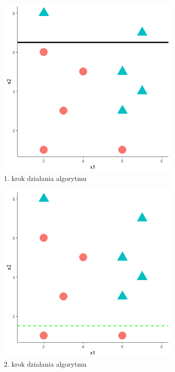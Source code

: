 \documentclass[12pt,a4paper,twoside,openany]{book}
\begin{document}
\begin{figure}[ht] 
  \begin{subfigure}[b]{0.5\linewidth}
    \centering
    \includegraphics[width=0.75\linewidth]{./rys005a} 
    \caption{1. krok działania algorytmu} 
    \label{rys005a} 
    \vspace{4ex}
  \end{subfigure}%
  \begin{subfigure}[b]{0.5\linewidth}
    \centering
    \includegraphics[width=0.75\linewidth]{./rys005b} 
    \caption{2. krok działania algorytmu} 
    \label{rys005b} 
    \vspace{4ex}
  \end{subfigure} 
  \begin{subfigure}[b]{0.5\linewidth}

\end{subfigure}
\end{figure}
\end{document}
